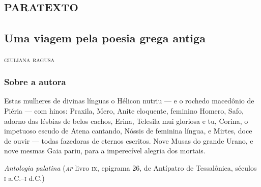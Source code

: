 \part{\textsc{paratexto}}

\chapter[Uma viagem pela poesia grega antiga, \emph{por Giuliana Ragusa}]{Uma viagem pela poesia grega antiga}

\begin{flushright}
\textsc{giuliana ragusa}
\end{flushright}

\section{Sobre a autora}

\epigraph{Estas mulheres de divinas línguas o Hélicon nutriu --- e o  %
rochedo macedônio de Piéria --- com hinos: %
Praxila, Mero, Anite eloquente, feminino Homero, %
Safo, adorno das lésbias de belos cachos, %
Erina, Telesila mui gloriosa e tu, Corina, %
o impetuoso escudo de Atena cantando, %
Nóssis de feminina língua, e Mirtes, doce de ouvir ---  %
todas fazedoras de eternos escritos. %
Nove Musas do grande Urano, e nove mesmas %
Gaia pariu, para a imperecível alegria dos mortais.}
{\textit{Antologia palatina} (\textit{\textsc{ap}} livro \textsc{ix}, epigrama 26, de Antípatro de Tessalônica,
séculos \textsc{i} a.C.--\textsc{i} d.C.)\footnotemark}


